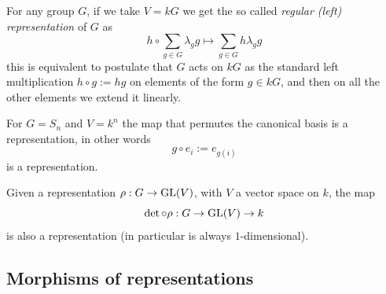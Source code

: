 \documentclass[11pt]{scrartcl}
\begin{document}
	\begin{definition}
		For any group $G$, if we take $V=kG$ we get the so called \textit{regular (left) representation} of $G$ as 
		$$h\circ \sum_{g\in G}\lambda_g g \mapsto \sum_{g\in G} h\lambda_g g$$
		this is equivalent to postulate that $G$ acts on $kG$ as the standard left multiplication $h\circ g:= hg$ on elements of the form $g\in kG$, and then on all the other elements we extend it linearly.
	\end{definition}
	\begin{example}
		For $G=S_n$ and $V=k^n$ the map that permutes the canonical basis is a representation, in other words
		$$g\circ e_i := e_{g(i)}$$
		is a representation.
	\end{example}
	\begin{example}[Determinant]
		Given a representation $\rho:G\to \operatorname{GL}(V)$, with $V$ a vector space on $k$, the map 
		$$\det\circ \rho:G\to \operatorname{GL}(V)\to k$$
		is also a representation (in particular is always $1$-dimensional).
	\end{example}
	
	\subsection{Morphisms of representations}
	
\end{document}
